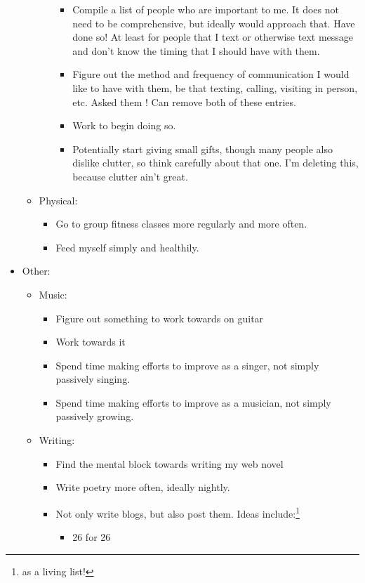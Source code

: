 \documentclass[12pt]{article}[titlepage]
\renewcommand{\,}{\textsuperscript{,}}
\begin{document}
\begin{itemize}
\begin{itemize}
\begin{itemize}
\begin{itemize}
\item Compile a list of people who are important to me. It does not need to be comprehensive, but ideally would approach that.   
Have done so! At least for people that I text or otherwise text message and don't know the timing that I should have with them.  
\item Figure out the method and frequency of communication I would like to have with them, be that texting, calling, visiting in person, etc.   
Asked them ! Can remove both of these entries.  
\item Work to begin doing so.   
\item Potentially start giving small gifts, though many people also dislike clutter, so think carefully about that one.   
I'm deleting this, because clutter ain't great.  
\end{itemize}  
\end{itemize}   
\item Physical:   
\begin{itemize}   
\item Go to group fitness classes more regularly and more often.   
\item Feed myself simply and healthily.   
\end{itemize}   
\end{itemize}   
\item Other:   
\begin{itemize}   
\item Music:   
\begin{itemize}   
\item Figure out something to work towards on guitar   
\item Work towards it   
\item Spend time making efforts to improve as a singer, not simply passively singing.   
\item Spend time making efforts to improve as a musician, not simply passively growing.   
\end{itemize}   
\item Writing:  
\begin{itemize}   
\item Find the mental block towards writing my web novel   
\item Write poetry more often, ideally nightly.   
\item Not only write blogs, but also post them. Ideas include:\footnote{as a living list!}  
\begin{itemize}   
\item 26 for 26   

\end{itemize}
\end{itemize}
\end{itemize}
\end{itemize}
\end{document}
